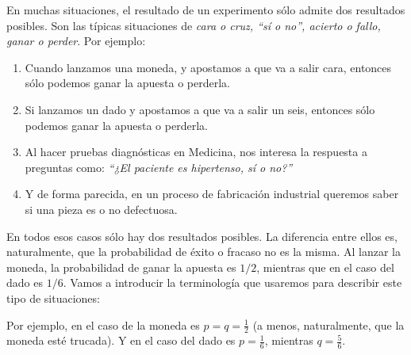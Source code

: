 En muchas situaciones, el resultado de un experimento sólo admite dos resultados posibles. Son las típicas situaciones de {\em cara o cruz, ``sí o no'', acierto o fallo, ganar o perder}.
Por ejemplo:
    \begin{enumerate}
            \item Cuando lanzamos una moneda, y apostamos a que va a salir cara, entonces sólo podemos ganar la apuesta o perderla.
            \item Si lanzamos un dado y apostamos a que va a salir un seis, entonces sólo podemos ganar la apuesta o perderla.
            \item Al hacer pruebas diagnósticas en Medicina, nos interesa la respuesta a preguntas como: {\em ``¿El paciente es hipertenso, sí o no?''}
            \item Y de forma parecida, en un proceso de fabricación industrial queremos saber si una pieza es o no defectuosa.
    \end{enumerate}
En todos esos casos sólo hay dos resultados posibles. La diferencia entre ellos es, naturalmente,  que la probabilidad de éxito o fracaso no es la misma. Al lanzar la moneda, la probabilidad de ganar la apuesta es $1/2$, mientras que en el caso del dado es $1/6$. Vamos a introducir la terminología que usaremos para describir este tipo de situaciones:
    \begin{center}
    \end{center}
Por ejemplo, en el caso de la moneda es $p=q=\frac{1}{2}$ (a menos, naturalmente, que la moneda esté trucada). Y en el caso del dado es $p=\frac{1}{6}$, mientras $q=\frac{5}{6}$.

